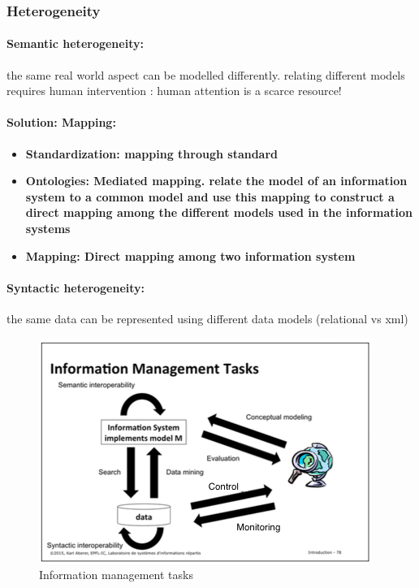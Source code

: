 \subsubsection{Heterogeneity}
\paragraph{Semantic heterogeneity:} the same real world aspect can be modelled differently. relating different models requires human intervention : human attention is a scarce resource!

\paragraph{Solution: Mapping:}
\begin{itemize}
\item \bf{Standardization:} mapping through standard
\item \bf{Ontologies:} Mediated mapping. relate the model of an information system to a common model and use this mapping to construct a direct mapping among the different models used in the information systems\\
\item \bf{Mapping:} Direct mapping among two information system
\end{itemize}

\paragraph{Syntactic heterogeneity:} the same data can be represented using different data models (relational vs xml)

\begin{figure}[!h]
\begin{center}
\includegraphics[width=1\linewidth]{figures/informationManagementTasks2.png}
\end{center}
\caption{Information management tasks}
\end{figure}


